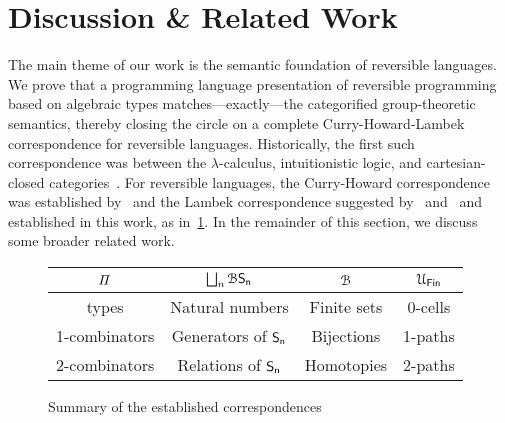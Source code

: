 \section{Discussion \& Related Work}
\label{sec:discussion}


The main theme of our work is the semantic foundation of reversible languages. We prove that a programming language
presentation of reversible programming based on algebraic types matches---exactly---the categorified group-theoretic
semantics, thereby closing the circle on a complete Curry-Howard-Lambek correspondence for reversible languages.
Historically, the first such correspondence was between the $\lambda$-calculus, intuitionistic logic, and
cartesian-closed categories~\cite{curryCurryEssaysCombinatory1980}. For reversible languages, the Curry-Howard
correspondence was established by~\citet{sparksSuperstructuralReversibleLogic2014} and the Lambek correspondence
suggested by~\citet{caretteComputingSemiringsWeak2016} and~\citet{threemodels} and established in this work, as in~\cref{fig:table-summary}. In the
remainder of this section, we discuss some broader related work.

\begin{figure}
    \begin{center}
        \begin{tabular}{|c|c|c|c|}
            \hline
            \rowcolor{lightgray} $\mathit{\Pi}$     & $\bigsqcup_n \mathcal{B}\Sn $ & $\BFin$     & $\UFin$ \tabularnewline
            \hline
            types         & Natural numbers                & Finite sets & 0-cells \tabularnewline
            \hline
            1-combinators & Generators of $\Sn$            & Bijections  & 1-paths \tabularnewline
            \hline
            2-combinators & Relations of $\Sn$             & Homotopies  & 2-paths \tabularnewline
            \hline
        \end{tabular}
    \end{center}
    \caption{Summary of the established correspondences}
    \label{fig:table-summary}
\end{figure}

